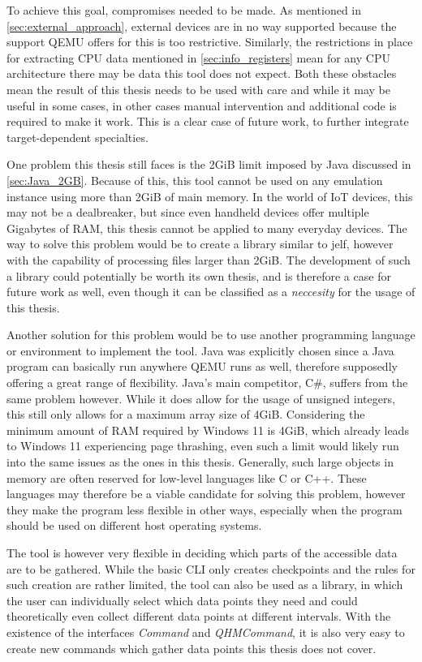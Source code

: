 To achieve this goal, compromises needed to be made.
As mentioned in \autoref{sec:external_approach}, external devices are in no way supported because the support QEMU offers for this is too restrictive.
Similarly, the restrictions in place for extracting CPU data mentioned in \autoref{sec:info_registers} mean for any CPU architecture there may be data this tool does not expect.
Both these obstacles mean the result of this thesis needs to be used with care
and while it may be useful in some cases, in other cases manual intervention and additional code is required to make it work.
This is a clear case of future work, to further integrate target-dependent specialties.

One problem this thesis still faces is the 2GiB limit imposed by Java discussed in \autoref{sec:Java_2GB}.
Because of this, this tool cannot be used on any emulation instance using more than 2GiB of main memory.
In the world of IoT devices, this may not be a dealbreaker, but since even handheld devices offer multiple Gigabytes of RAM,
this thesis cannot be applied to many everyday devices.
The way to solve this problem would be to create a library similar to jelf\cite{jelf},
however with the capability of processing files larger than 2GiB.
The development of such a library could potentially be worth its own thesis,
and is therefore a case for future work as well,
even though it can be classified as a \emph{neccesity} for the usage of this thesis.

Another solution for this problem would be to use another programming language or environment to implement the tool.
Java was explicitly chosen since a Java program can basically run anywhere QEMU runs as well,
therefore supposedly offering a great range of flexibility.
Java's main competitor, C\#, suffers from the same problem however.
While it does allow for the usage of unsigned integers,
this still only allows for a maximum array size of 4GiB.
Considering the minimum amount of RAM required by Windows 11 is 4GiB,
which already leads to Windows 11 experiencing page thrashing,
even such a limit would likely run into the same issues as the ones in this thesis.
Generally, such large objects in memory are often reserved for low-level languages like C or C++.
These languages may therefore be a viable candidate for solving this problem,
however they make the program less flexible in other ways,
especially when the program should be used on different host operating systems.

The tool is however very flexible in deciding which parts of the accessible data are to be gathered.
While the basic CLI only creates checkpoints and the rules for such creation are rather limited,
the tool can also be used as a library, in which the user can individually select which data points they need
and could theoretically even collect different data points at different intervals.
With the existence of the interfaces \emph{Command} and \emph{QHMCommand},
it is also very easy to create new commands which gather data points this thesis does not cover.

